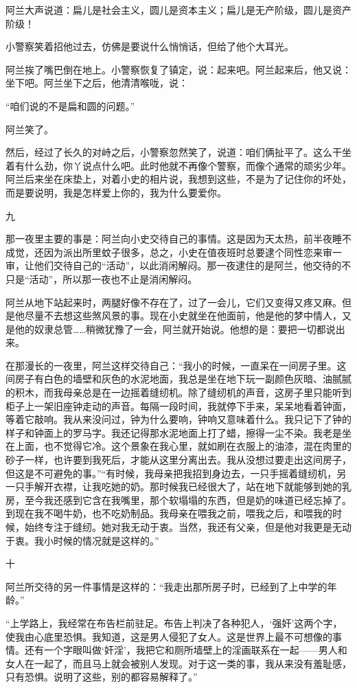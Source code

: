阿兰大声说道：扁儿是社会主义，圆儿是资本主义；扁儿是无产阶级，圆儿是资产阶级！ 

小警察笑着招他过去，仿佛是要说什么悄悄话，但给了他个大耳光。 

阿兰挨了嘴巴倒在地上。小警察恢复了镇定，说：起来吧。阿兰起来后，他又说：坐下吧。阿兰坐下之后，他清清喉咙，说： 

“咱们说的不是扁和圆的问题。” 

阿兰笑了。 

然后，经过了长久的对峙之后，小警察忽然笑了，说道：咱们俩扯平了。这么干坐着有什么劲，你丫说点什么吧。此时他就不再像个警察，而像个通常的顽劣少年。阿兰后来坐在床垫上，对着小史的相片说，我想到这些，不是为了记住你的坏处，而是要说明，我是怎样爱上你的，我为什么要爱你。 

九 

那一夜里主要的事是：阿兰向小史交待自己的事情。这是因为天太热，前半夜睡不成觉，还因为派出所里蚊子很多，总之，小史在值夜班时总要逮个同性恋来审一审，让他们交待自己的“活动”，以此消闲解闷。那一夜逮住的是阿兰，他交待的不只是“活动”，所以那一夜也不止是消闲解闷。 

阿兰从地下站起来时，两腿好像不存在了，过了一会儿，它们又变得又疼又麻。但是他尽量不去想这些煞风景的事。现在小史就坐在他面前，他是他的梦中情人，又是他的奴隶总管……稍微犹豫了一会，阿兰就开始说。他想的是：要把一切都说出来。 

在那漫长的一夜里，阿兰这样交待自己：“我小的时候，一直呆在一间房子里。这间房子有白色的墙壁和灰色的水泥地面，我总是坐在地下玩一副颜色灰暗、油腻腻的积木，而我母亲总是在一边摇着缝纫机。除了缝纫机的声音，这房子里只能听到柜子上一架旧座钟走动的声音。每隔一段时间，我就停下手来，呆呆地看着钟面，等着它敲响。我从来没问过，钟为什么要响，钟响又意味着什么。我只记下了钟的样子和钟面上的罗马字。我还记得那水泥地面上打了蜡，擦得一尘不染。我老是坐在上面，也不觉得它冷。这个景象在我心里，就如刷在衣服上的油漆，混在肉里的砂子一样，也许要到我死后，才能从这里分离出去。我从没想过要走出这间房子，但这是不可避免的事。”“有时候，我母亲把我招到身边去，一只手摇着缝纫机，另一只手解开衣襟，让我吃她的奶。那时候我已经很大了，站在地下就能够到她的乳房，至今我还感到它含在我嘴里，那个软塌塌的东西，但是奶的味道已经忘掉了。到现在我不喝牛奶，也不吃奶制品。我母亲在喂我之前，喂我之后，和喂我的时候，始终专注于缝纫。她对我无动于衷。当然，我还有父亲，但是他对我更是无动于衷。我小时候的情况就是这样的。” 

十 

阿兰所交待的另一件事情是这样的：“我走出那所房子时，已经到了上中学的年龄。” 

“上学路上，我经常在布告栏前驻足。布告上判决了各种犯人，‘强奸’这两个字，使我由心底里恐惧。我知道，这是男人侵犯了女人。这是世界上最不可想像的事情。还有一个字眼叫做‘奸淫’，我把它和厕所墙壁上的淫画联系在一起——男人和女人在一起了，而且马上就会被别人发现。对于这一类的事，我从来没有羞耻感，只有恐惧。说明了这些，别的都容易解释了。” 

